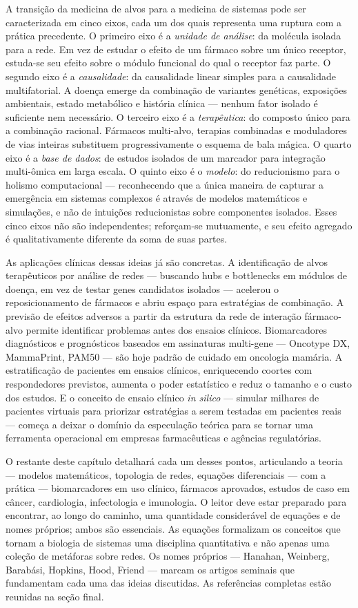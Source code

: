 A transição da medicina de alvos para a medicina de sistemas pode ser caracterizada em cinco eixos, cada um dos quais representa uma ruptura com a prática precedente. O primeiro eixo é a \emph{unidade de análise}: da molécula isolada para a rede. Em vez de estudar o efeito de um fármaco sobre um único receptor, estuda-se seu efeito sobre o módulo funcional do qual o receptor faz parte. O segundo eixo é a \emph{causalidade}: da causalidade linear simples para a causalidade multifatorial. A doença emerge da combinação de variantes genéticas, exposições ambientais, estado metabólico e história clínica --- nenhum fator isolado é suficiente nem necessário. O terceiro eixo é a \emph{terapêutica}: do composto único para a combinação racional. Fármacos multi-alvo, terapias combinadas e moduladores de vias inteiras substituem progressivamente o esquema de bala mágica. O quarto eixo é a \emph{base de dados}: de estudos isolados de um marcador para integração multi-ômica em larga escala. O quinto eixo é o \emph{modelo}: do reducionismo para o holismo computacional --- reconhecendo que a única maneira de capturar a emergência em sistemas complexos é através de modelos matemáticos e simulações, e não de intuições reducionistas sobre componentes isolados. Esses cinco eixos não são independentes; reforçam-se mutuamente, e seu efeito agregado é qualitativamente diferente da soma de suas partes.

As aplicações clínicas dessas ideias já são concretas. A identificação de alvos terapêuticos por análise de redes --- buscando hubs e bottlenecks em módulos de doença, em vez de testar genes candidatos isolados --- acelerou o reposicionamento de fármacos e abriu espaço para estratégias de combinação. A previsão de efeitos adversos a partir da estrutura da rede de interação fármaco-alvo permite identificar problemas antes dos ensaios clínicos. Biomarcadores diagnósticos e prognósticos baseados em assinaturas multi-gene --- Oncotype DX, MammaPrint, PAM50 --- são hoje padrão de cuidado em oncologia mamária. A estratificação de pacientes em ensaios clínicos, enriquecendo coortes com respondedores previstos, aumenta o poder estatístico e reduz o tamanho e o custo dos estudos. E o conceito de ensaio clínico \emph{in silico} --- simular milhares de pacientes virtuais para priorizar estratégias a serem testadas em pacientes reais --- começa a deixar o domínio da especulação teórica para se tornar uma ferramenta operacional em empresas farmacêuticas e agências regulatórias.

O restante deste capítulo detalhará cada um desses pontos, articulando a teoria --- modelos matemáticos, topologia de redes, equações diferenciais --- com a prática --- biomarcadores em uso clínico, fármacos aprovados, estudos de caso em câncer, cardiologia, infectologia e imunologia. O leitor deve estar preparado para encontrar, ao longo do caminho, uma quantidade considerável de equações e de nomes próprios; ambos são essenciais. As equações formalizam os conceitos que tornam a biologia de sistemas uma disciplina quantitativa e não apenas uma coleção de metáforas sobre redes. Os nomes próprios --- Hanahan, Weinberg, Barabási, Hopkins, Hood, Friend --- marcam os artigos seminais que fundamentam cada uma das ideias discutidas. As referências completas estão reunidas na seção final.
